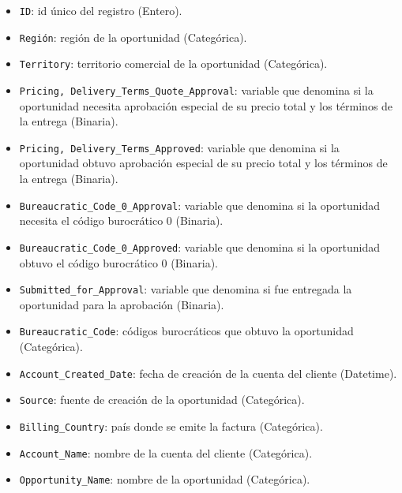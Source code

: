 \documentclass[titlepage,a4paper]{article}
\begin{document}
\begin{itemize}
    \item \verb|ID|: id único del registro (Entero).

    \item \verb|Región|: región de la oportunidad (Categórica).

    \item \verb|Territory|: territorio comercial de la oportunidad (Categórica).

    \item \verb|Pricing, Delivery_Terms_Quote_Approval|: variable que denomina si la oportunidad necesita aprobación especial de su precio total y los términos de la entrega (Binaria).

    \item \verb|Pricing, Delivery_Terms_Approved|: variable que denomina si la oportunidad obtuvo aprobación especial de su precio total y los términos de la entrega (Binaria).

    \item \verb|Bureaucratic_Code_0_Approval|: variable que denomina si la oportunidad necesita el código burocrático 0 (Binaria).

    \item \verb|Bureaucratic_Code_0_Approved|: variable que denomina si la oportunidad obtuvo el código burocrático 0 (Binaria).

    \item \verb|Submitted_for_Approval|: variable que denomina si fue entregada la oportunidad para la aprobación (Binaria).

    \item \verb|Bureaucratic_Code|: códigos burocráticos que obtuvo la oportunidad (Categórica).

    \item \verb|Account_Created_Date|: fecha de creación de la cuenta del cliente (Datetime).

    \item \verb|Source|: fuente de creación de la oportunidad (Categórica).

    \item \verb|Billing_Country|: país donde se emite la factura (Categórica).

    \item \verb|Account_Name|: nombre de la cuenta del cliente (Categórica).

    \item \verb|Opportunity_Name|: nombre de la oportunidad (Categórica).


\end{itemize}
\end{document}
